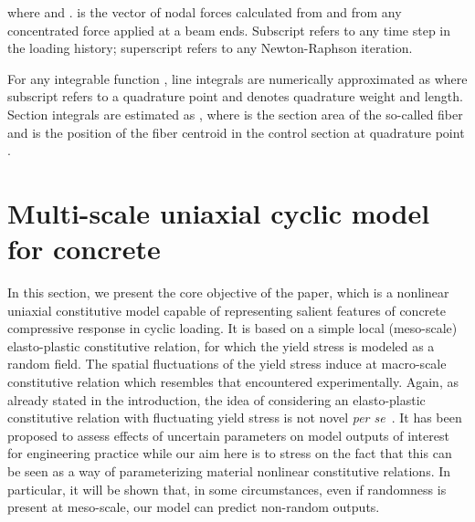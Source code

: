 \documentclass[12p]{amsart}
\begin{document}
where  and .  is the vector of nodal forces calculated from  and from any concentrated force applied at a beam ends. Subscript  refers to any time step in the loading history; superscript  refers to any Newton-Raphson iteration. 

For any integrable function , line integrals are numerically approximated as  where subscript  refers to a quadrature point and  denotes quadrature weight and length. Section integrals are estimated as , where  is the section area of the so-called fiber  and  is the position of the fiber centroid in the control section  at quadrature point .


\section{Multi-scale uniaxial cyclic model for concrete}\label{sec:concr-law}

In this section, we present the core objective of the paper, which is a nonlinear uniaxial constitutive model capable of representing salient features of concrete compressive response in cyclic loading. It is based on a simple local (meso-scale) elasto-plastic constitutive relation, for which the yield stress is modeled as a random field. The spatial fluctuations of the yield stress induce at macro-scale constitutive relation  which resembles that encountered experimentally. Again, as already stated in the introduction, the idea of considering an elasto-plastic constitutive relation with fluctuating yield stress is not novel {\it per se}~\cite{Liu1986, Brenner1995, Huh2001, Namikawa2013}. It has been proposed to assess effects of uncertain parameters on model outputs of interest for engineering practice while our aim here is to stress on the fact that this can be seen as a way of parameterizing material nonlinear constitutive relations. In particular, it will be shown that, in some circumstances, even if randomness is present at meso-scale, our model can predict non-random outputs.
\end{document}
